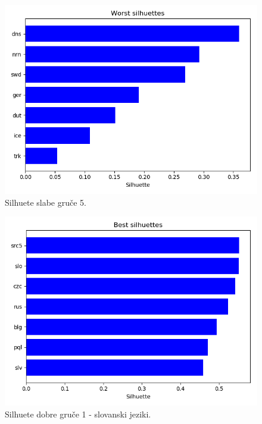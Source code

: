 \documentclass[a4paper,11pt]{article}
\begin{document}
\begin{figure}[htbp]
	\begin{center}
		\includegraphics[scale=0.5]{worst5.png}
		\caption{Silhuete slabe gruče 5.}
		\label{slika1}
	\end{center}
\end{figure}

\begin{figure}[htbp]
	\begin{center}
		\includegraphics[scale=0.5]{best1.png}
		\caption{Silhuete dobre gruče 1 - slovanski jeziki.}
		\label{slika1}
	\end{center}
\end{figure}
\end{document}
